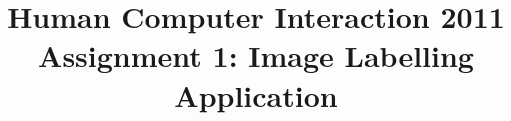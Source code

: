 \title{\vspace{-0.05\textheight}Human Computer Interaction 2011\\\large{Assignment 1: Image Labelling Application}}

\author{
\\
}
